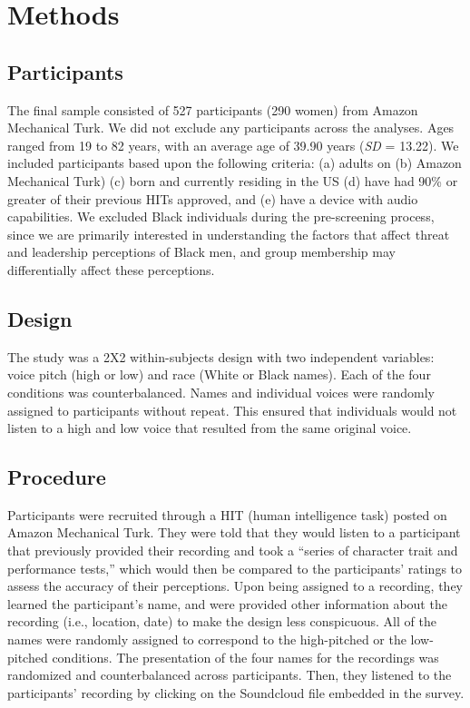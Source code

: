 \documentclass[
  english,
  man, noextraspace,floatsintext]{apa6}
\begin{document}
\hypertarget{methods}{%
\section{Methods}\label{methods}}

\hypertarget{participants}{%
\subsection{Participants}\label{participants}}

The final sample consisted of 527 participants (290 women) from Amazon Mechanical Turk. We did not exclude any participants across the analyses. Ages ranged from 19 to 82 years, with an average age of 39.90 years (\emph{SD} = 13.22). We included participants based upon the following criteria: (a) adults on (b) Amazon Mechanical Turk) (c) born and currently residing in the US (d) have had 90\% or greater of their previous HITs approved, and (e) have a device with audio capabilities. We excluded Black individuals during the pre-screening process, since we are primarily interested in understanding the factors that affect threat and leadership perceptions of Black men, and group membership may differentially affect these perceptions.

\hypertarget{design}{%
\subsection{Design}\label{design}}

The study was a 2X2 within-subjects design with two independent variables: voice pitch (high or low) and race (White or Black names). Each of the four conditions was counterbalanced. Names and individual voices were randomly assigned to participants without repeat. This ensured that individuals would not listen to a high and low voice that resulted from the same original voice.

\hypertarget{procedure}{%
\subsection{Procedure}\label{procedure}}

Participants were recruited through a HIT (human intelligence task) posted on Amazon Mechanical Turk. They were told that they would listen to a participant that previously provided their recording and took a ``series of character trait and performance tests,'' which would then be compared to the participants' ratings to assess the accuracy of their perceptions. Upon being assigned to a recording, they learned the participant's name, and were provided other information about the recording (i.e., location, date) to make the design less conspicuous. All of the names were randomly assigned to correspond to the high-pitched or the low-pitched conditions. The presentation of the four names for the recordings was randomized and counterbalanced across participants. Then, they listened to the participants' recording by clicking on the Soundcloud file embedded in the survey.
\end{document}
